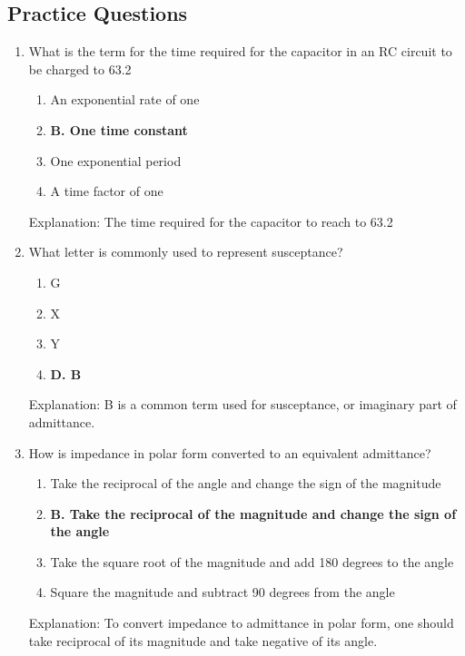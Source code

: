 \subsection*{Practice Questions}
\begin{enumerate}
   \item What is the term for the time required for the capacitor in an RC circuit to be charged to 63.2%
     \begin{enumerate}
       \item  An exponential rate of one
         \item \textbf{B. One time constant}
        \item  One exponential period
        \item  A time factor of one
      \end{enumerate}
    \textcolor{myred}{Explanation:}
    The time required for the capacitor to reach to 63.2%

   \item What letter is commonly used to represent susceptance?
       \begin{enumerate}
         \item  G
         \item  X
        \item  Y
      \item \textbf{D. B}
       \end{enumerate}
     \textcolor{myred}{Explanation:}
    B is a common term used for susceptance, or imaginary part of admittance.

    \item How is impedance in polar form converted to an equivalent admittance?
      \begin{enumerate}
      \item  Take the reciprocal of the angle and change the sign of the magnitude
     \item \textbf{B. Take the reciprocal of the magnitude and change the sign of the angle}
      \item  Take the square root of the magnitude and add 180 degrees to the angle
        \item  Square the magnitude and subtract 90 degrees from the angle
        \end{enumerate}
    \textcolor{myred}{Explanation:}
    To convert impedance to admittance in polar form, one should take reciprocal of its magnitude and take negative of its angle.
       

\end{enumerate}
